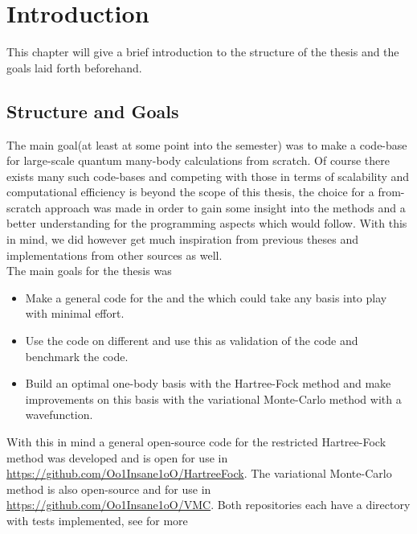 \chapter{Introduction\label{chapter:1}}
    This chapter will give a brief introduction to the structure of the thesis
    and the goals laid forth beforehand.

\section{Structure and Goals\label{sec:structure_and_goals}}
    The main goal(at least at some point into the semester) was to make a
    code-base for large-scale quantum many-body calculations from scratch. Of
    course there exists many such code-bases and competing with those in terms
    of scalability and computational efficiency is beyond the scope of this
    thesis, the choice for a from-scratch approach was made in order to gain
    some insight into the methods and a better understanding for the
    programming aspects which would follow. With this in mind, we did however
    get much inspiration from previous theses and implementations from other
    sources as well. \\
    The main goals for the thesis was
        \begin{itemize}
            \item Make a general \CC code for the 
                and the  which could take
                any basis into play with minimal effort.
            \item Use the \CC code on different  and use this as validation of the code and
                benchmark the code.
            \item Build an optimal one-body basis with the Hartree-Fock method
                and make improvements on this basis with the variational
                Monte-Carlo method with a  wavefunction.
        \end{itemize}
    With this in mind a general open-source code for the restricted
    Hartree-Fock method was developed and is open for use in
    \url{https://github.com/Oo1Insane1oO/HartreeFock}. The variational
    Monte-Carlo method is also open-source and for use in
    \url{https://github.com/Oo1Insane1oO/VMC}. Both repositories each have a
    directory with tests implemented, see  for more
